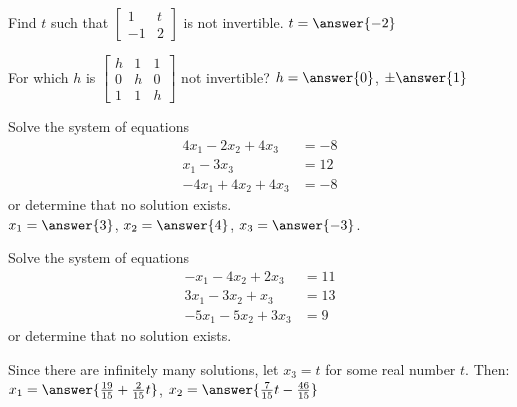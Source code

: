 \documentclass{ximera}
\begin{document}
\begin{exercise}%
    Find $t$ such that
    $\left[ 
        \begin{smallmatrix}
            1 & t \\
            -1 & 2
        \end{smallmatrix}
    \right]$
    is not invertible. $t = \answer{-2}$
\end{exercise}

\begin{exercise}
    For which $h$ is
    $\left[ 
        \begin{smallmatrix}
            h & 1 & 1 \\
            0 & h & 0 \\
            1 & 1 & h
        \end{smallmatrix} 
    \right]$
    not invertible? $h = \answer{0}$, $\pm \answer{1}$
\end{exercise}

\begin{exercise}%
    Solve the system of equations
    \begin{equation*}
        \begin{split}
             4x_1 - 2x_2 + 4x_3 &= -8 \\ 
             x_1 - 3x_3 &= 12\\
            -4x_1 + 4x_2 + 4x_3 &= -8 
        \end{split}
    \end{equation*}
    or determine that no solution exists.\\
    $x_1 = \answer{3}$, $x_2 = \answer{4}$, $x_3 = \answer{-3}$.
\end{exercise}

\begin{exercise}%
    Solve the system of equations
    \begin{equation*}
        \begin{split}
             -x_1 - 4x_2 + 2x_3 &= 11 \\ 
             3x_1 -3x_2 + x_3 &= 13\\
            -5x_1 - 5x_2 + 3x_3 &= 9 
        \end{split}
    \end{equation*}
    or determine that no solution exists.
    \begin{multipleChoice}
    \end{multipleChoice}
    \begin{problem}
        Since there are infinitely many solutions, let $x_3 = t$ for some real number $t$. Then: $x_1 = \answer{\frac{19}{15} + \frac{2}{15}t}$, $x_2 = \answer{\frac{7}{15}t - \frac{46}{15}}$
    \end{problem}
\end{exercise}
\end{document}
